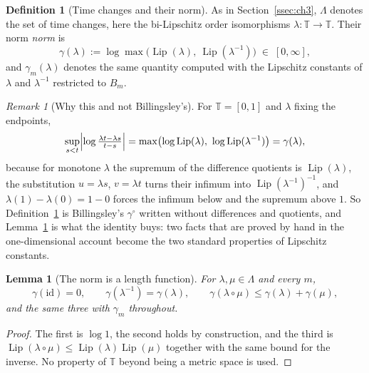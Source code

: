 \documentclass[11pt,a4paper]{article}
\theoremstyle{plain}
\newtheorem{lemma}[theorem]{Lemma}
\theoremstyle{definition}
\newtheorem{definition}[theorem]{Definition}
\theoremstyle{remark}
\newtheorem{remark}[theorem]{Remark}
\newcommand{\T}{\mathbb{T}}                     %
\DeclareMathOperator{\Lip}{Lip}
\begin{document}
\begin{definition}[Time changes and their norm]
  \label{def:timechange}
  As in Section~\ref{ssec:ch3}, $\Lambda$ denotes the set of time changes, here
  the bi-Lipschitz order isomorphisms $\lambda : \T \to \T$.  Their norm
  \emph{norm} is
  \begin{equation}
    \label{eq:gamma}
    \gamma(\lambda)
      := \log \max\bigl( \Lip(\lambda),\ \Lip(\lambda^{-1}) \bigr)
      \;\in\; [0,\infty],
  \end{equation}
  and $\gamma_m(\lambda)$ denotes the same quantity computed with the
  Lipschitz constants of $\lambda$ and $\lambda^{-1}$ restricted to $B_m$.
\end{definition}

\begin{remark}[Why this and not Billingsley's]
  \label{rem:logslope}
  For $\T = [0,1]$ and $\lambda$ fixing the endpoints,
  \[
    \sup_{s < t} \Bigl| \log \tfrac{\lambda t - \lambda s}{t - s} \Bigr|
      = \max\bigl( \log \Lip(\lambda),\ \log \Lip(\lambda^{-1}) \bigr)
      = \gamma(\lambda),
  \]
  because for monotone $\lambda$ the supremum of the difference quotients is
  $\Lip(\lambda)$, the substitution $u = \lambda s$, $v = \lambda t$ turns their
  infimum into $\Lip(\lambda^{-1})^{-1}$, and $\lambda(1) - \lambda(0) = 1 - 0$
  forces the infimum below and the supremum above $1$.  So
  Definition~\ref{def:timechange} is Billingsley's $\gamma^\circ$
  written without differences and quotients, and Lemma~\ref{lem:tcnorm} is what
  the identity buys: two facts that are proved by hand in the one-dimensional
  account become the two standard properties of Lipschitz constants.
\end{remark}

\begin{lemma}[The norm is a length function]
  \label{lem:tcnorm}
  For $\lambda, \mu \in \Lambda$ and every $m$,
  \[
    \gamma(\mathrm{id}) = 0, \qquad
    \gamma(\lambda^{-1}) = \gamma(\lambda), \qquad
    \gamma(\lambda \circ \mu) \leq \gamma(\lambda) + \gamma(\mu),
  \]
  and the same three with $\gamma_m$ throughout.
\end{lemma}

\begin{proof}
  The first is $\log 1$, the second holds by construction, and the third is
  $\Lip(\lambda \circ \mu) \leq \Lip(\lambda) \Lip(\mu)$ together with the same
  bound for the inverse.  No property of $\T$ beyond being a metric space is
  used.
\end{proof}
\end{document}
